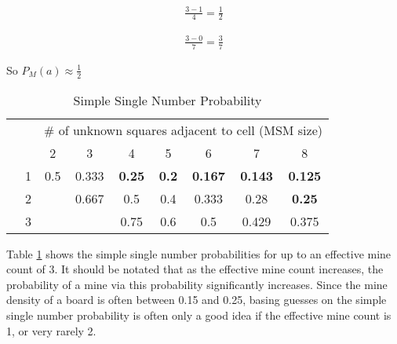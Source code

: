 {\begin{center}
\begin{minipage}{0.3\linewidth}
{\begin{minesweeperboard}
    \end{minesweeperboard}}\begin{align*}
        \frac{3-1}{4}=\frac{1}{2}
    \end{align*}\end{minipage}
    \begin{minipage}{0.3\linewidth}\centering{}\begin{align*}
        \frac{3-0}{7}=\frac{3}{7}
    \end{align*}\end{minipage}
\end{center}
So $P_M(a)\approx\frac{1}{2}$
}

\begin{table}[h]
    \centering
    \bgroup
    \def\arraystretch{1.5}
    \begin{tabular}{|c|c|c|c|c|c|c|c|c|}\hline
        & & \multicolumn{7}{c|}{\# of unknown squares adjacent to cell (MSM size)}\\
         & & 2 & 3 & 4 & 5 & 6 & 7 & 8\\\hline
        \parbox[t]{2mm}{}& 1 & 0.5 & 0.333 & \textbf{0.25} & \textbf{0.2} & \textbf{0.167} & \textbf{0.143} & \textbf{0.125}\\
        & 2 & & 0.667 & 0.5 & 0.4 & 0.333 & 0.28 & \textbf{0.25}\\
        & 3 & & & 0.75 & 0.6 & 0.5 & 0.429 & 0.375\\\hline
    \end{tabular}
    \egroup
    \caption{Simple Single Number Probability}
    \label{tab:simple-single-number-prob}
\end{table}

Table \ref{tab:simple-single-number-prob} shows the simple single number probabilities for up to an effective mine count of 3. It should be notated that as the effective mine count increases, the probability of a mine via this probability significantly increases. Since the mine density of a board is often between 0.15 and 0.25, basing guesses on the simple single number probability is often only a good idea if the effective mine count is 1, or very rarely 2.\\

